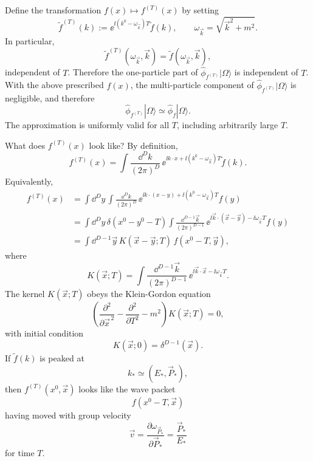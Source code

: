 Define the transformation \(f(x)\mapsto f^{(T)}(x)\) by setting
\[
  \widetilde f^{(T)}(k)
  :=
  \ee^{\ii(k^0-\omega_{\vec k})T}\widetilde f(k),
  \qquad
  \omega_{\vec k}=\sqrt{\vec k^2+m^2}.
\]
In particular,
\[
  \widetilde f^{(T)}(\omega_{\vec k},\vec k)
  =
  \widetilde f(\omega_{\vec k},\vec k),
\]
independent of \(T\). Therefore the one-particle part of
\(\hat\phi_{f^{(T)}}|\Omega\rangle\) is independent of \(T\). With the above
prescribed \(f(x)\), the multi-particle component of
\(\hat\phi_{f^{(T)}}|\Omega\rangle\) is negligible, and therefore
\[
  \hat\phi_{f^{(T)}}|\Omega\rangle
  \simeq
  \hat\phi_f|\Omega\rangle.
\]
The approximation is uniformly valid for all \(T\), including arbitrarily
large \(T\).

What does \(f^{(T)}(x)\) look like? By definition,
\[
  f^{(T)}(x)
  =
  \int\frac{\dd^Dk}{(2\pi)^D}\,
  \ee^{\ii k\cdot x+\ii(k^0-\omega_{\vec k})T}
  \widetilde f(k).
\]
Equivalently,
\[
\begin{aligned}
  f^{(T)}(x)
  &=
  \int\dd^Dy\,
  \int\frac{\dd^Dk}{(2\pi)^D}\,
  \ee^{\ii k\cdot(x-y)+\ii(k^0-\omega_{\vec k})T}
  f(y) \\
  &=
  \int\dd^Dy\,
  \delta(x^0-y^0-T)
  \int\frac{\dd^{D-1}\vec k}{(2\pi)^{D-1}}\,
  \ee^{\ii\vec k\cdot(\vec x-\vec y)-\ii\omega_{\vec k}T}
  f(y) \\
  &=
  \int\dd^{D-1}\vec y\,
  K(\vec x-\vec y;T)\,
  f(x^0-T,\vec y),
\end{aligned}
\]
where
\[
  K(\vec x;T)
  =
  \int\frac{\dd^{D-1}\vec k}{(2\pi)^{D-1}}\,
  \ee^{\ii\vec k\cdot\vec x-\ii\omega_{\vec k}T}.
\]
The kernel \(K(\vec x;T)\) obeys the Klein-Gordon equation
\[
  \left(
    \frac{\partial^2}{\partial\vec x^{\,2}}
    -
    \frac{\partial^2}{\partial T^2}
    -
    m^2
  \right)
  K(\vec x;T)=0,
\]
with initial condition
\[
  K(\vec x;0)=\delta^{D-1}(\vec x).
\]
If \(\widetilde f(k)\) is peaked at
\[
  k_*\simeq(E_*,\vec P_*),
\]
then \(f^{(T)}(x^0,\vec x)\) looks like the wave packet
\[
  f(x^0-T,\vec x)
\]
having moved with group velocity
\[
  \vec v
  =
  \frac{\partial\omega_{\vec P_*}}{\partial\vec P_*}
  =
  \frac{\vec P_*}{E_*}
\]
for time \(T\).


